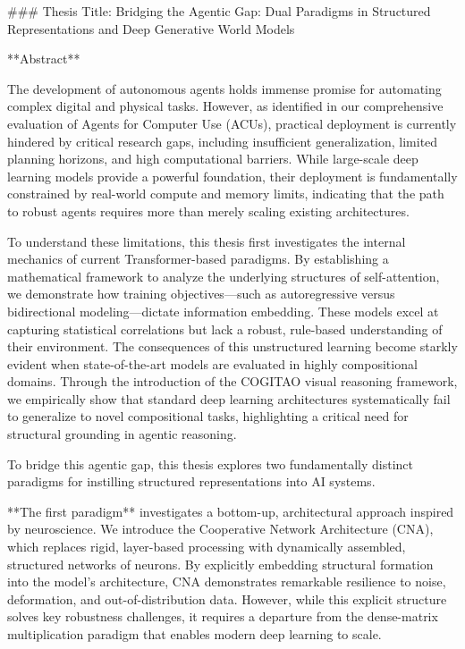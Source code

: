 
### Thesis Title: Bridging the Agentic Gap: Dual Paradigms in Structured Representations and Deep Generative World Models

**Abstract**

The development of autonomous agents holds immense promise for automating complex digital and physical tasks. However, as identified in our comprehensive evaluation of Agents for Computer Use (ACUs), practical deployment is currently hindered by critical research gaps, including insufficient generalization, limited planning horizons, and high computational barriers. While large-scale deep learning models provide a powerful foundation, their deployment is fundamentally constrained by real-world compute and memory limits, indicating that the path to robust agents requires more than merely scaling existing architectures. 

To understand these limitations, this thesis first investigates the internal mechanics of current Transformer-based paradigms. By establishing a mathematical framework to analyze the underlying structures of self-attention, we demonstrate how training objectives—such as autoregressive versus bidirectional modeling—dictate information embedding. These models excel at capturing statistical correlations but lack a robust, rule-based understanding of their environment. The consequences of this unstructured learning become starkly evident when state-of-the-art models are evaluated in highly compositional domains. Through the introduction of the COGITAO visual reasoning framework, we empirically show that standard deep learning architectures systematically fail to generalize to novel compositional tasks, highlighting a critical need for structural grounding in agentic reasoning.

To bridge this agentic gap, this thesis explores two fundamentally distinct paradigms for instilling structured representations into AI systems. 

**The first paradigm** investigates a bottom-up, architectural approach inspired by neuroscience. We introduce the Cooperative Network Architecture (CNA), which replaces rigid, layer-based processing with dynamically assembled, structured networks of neurons. By explicitly embedding structural formation into the model’s architecture, CNA demonstrates remarkable resilience to noise, deformation, and out-of-distribution data. However, while this explicit structure solves key robustness challenges, it requires a departure from the dense-matrix multiplication paradigm that enables modern deep learning to scale. 

